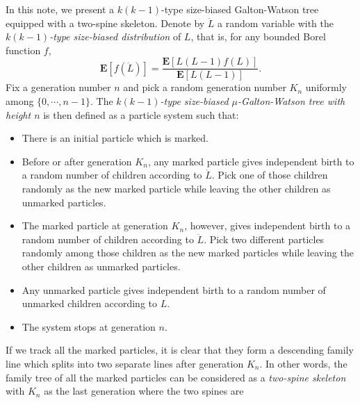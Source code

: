 \documentclass[12pt]{amsart}
\theoremstyle{remark}
\numberwithin{equation}{section}
\newcommand{\defn}[1]{{\em #1}}
\newcommand{\expr}[1]{\left( #1 \right)}
\newcommand{\brac}[1]{\left[ #1 \right]}
\newcommand{\expct}{\mathbf E}
\begin{document}
\par
In this note, we present a $k(k-1)$-type size-biased Galton-Watson tree 
equipped with a two-spine skeleton. 
	Denote by $\ddot L$ a random variable with the \defn{$k(k-1)$-type size-biased distribution} of $L$, that is, for any bounded Borel function $f$,
\begin{equation*}
		\expct\brac{f\expr{\ddot L}}
	=
		\frac{\expct\brac{L(L-1)f(L)}}{\expct\brac{L(L-1)}}.
\end{equation*}
	Fix a generation number $n$ and pick a random generation number $K_n$ uniformly among
$\{0,\cdots,n-1\}$.
The \defn{$k(k-1)$-type size-biased $\mu$-Galton-Watson tree with height $n$} is then defined as a particle system such that:
\begin{itemize}
\item
	There is an initial particle which is marked.
\item
	Before or after generation $K_n$, any marked particle gives independent birth to a random number of children according to $\dot L$. Pick one of those children randomly as 
the new marked particle while leaving the other children as unmarked particles.
\item
The marked particle at generation $K_n$, however, gives independent birth 
to a random number of children according to $\ddot L$. 
Pick two different particles randomly among those children 
as the new marked particles while leaving the other children as unmarked particles.
\item
	Any unmarked particle gives independent birth to a random number of unmarked children according to $L$.
\item
	The system stops at generation $n$.
\end{itemize}
\par
	If we track all the marked particles, it is clear that they form a descending family line which splits into two separate lines after generation $K_n$. In other words, the family tree of all the marked particles can be considered as a 
\defn{two-spine skeleton} with $K_n$ as the last generation where the two spines are
\end{document}

